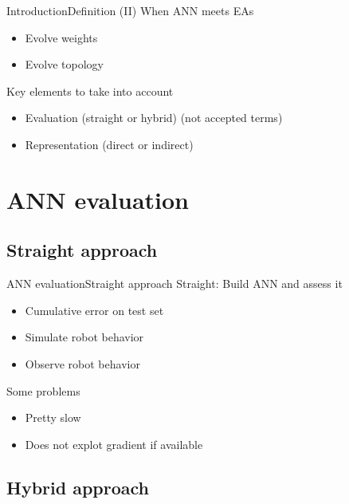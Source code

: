 \documentclass[10pt,compress]{beamer} %
\begin{document}
\begin{frame}{Introduction}{Definition (II)}
    When ANN meets EAs
	\begin{itemize}
        \item Evolve weights
        \item Evolve topology
	\end{itemize}
    Key elements to take into account
	\begin{itemize}
        \item Evaluation (straight or hybrid) (not accepted terms)
        \item Representation (direct or indirect)
	\end{itemize}
\end{frame}

\section{ANN evaluation}

\subsection{Straight approach}

\begin{frame}{ANN evaluation}{Straight approach}
	Straight: Build ANN and assess it
   		\begin{itemize}
		\item Cumulative error on test set
		\item Simulate robot behavior
		\item Observe robot behavior
   		\end{itemize}
	Some problems
		\begin{itemize}
		\item Pretty slow
		\item Does not explot gradient if available
		\end{itemize}
\end{frame}

\subsection{Hybrid approach}
\end{document}
